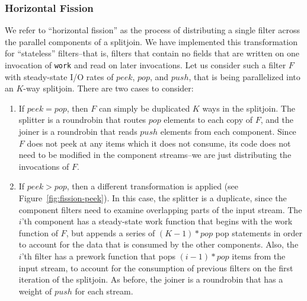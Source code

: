 \subsubsection{Horizontal Fission}

We refer to ``horizontal fission'' as the process of distributing a
single filter across the parallel components of a splitjoin.  We have
implemented this transformation for ``stateless'' filters--that is,
filters that contain no fields that are written on one invocation of
{\tt work} and read on later invocations.  Let us consider such a
filter $F$ with steady-state I/O rates of $peek$, $pop$, and $push$,
that is being parallelized into an $K$-way splitjoin.  There are two
cases to consider:
\begin{enumerate}
\item If {\bf $peek = pop$}, then $F$ can simply be duplicated $K$
ways in the splitjoin.  The splitter is a roundrobin that routes $pop$
elements to each copy of $F$, and the joiner is a roundrobin that
reads $push$ elements from each component.  Since $F$ does not peek at
any items which it does not consume, its code does not need to be
modified in the component streams--we are just distributing the
invocations of $F$.

\item If {\bf $peek > pop$}, then a different transformation is
applied (see Figure~\ref{fig:fission-peek}).  In this case, the
splitter is a duplicate, since the component filters need to examine
overlapping parts of the input stream.  The $i$'th component has a
steady-state work function that begins with the work function of $F$,
but appends a series of $(K-1)*pop$ pop statements in order to account
for the data that is consumed by the other components.  Also, the
$i$'th filter has a prework function that pops $(i-1)*pop$ items from
the input stream, to account for the consumption of previous filters
on the first iteration of the splitjoin.  As before, the joiner is a
roundrobin that has a weight of $push$ for each stream.
\end{enumerate}

